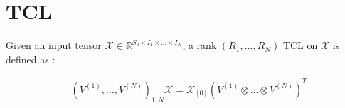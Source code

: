 \documentclass{article}
\begin{document}




%
%
%
%
%
%
%
%



\appendix


\section{TCL}
\label{A-tcl}
Given an input tensor $\mathcal{X} \in \mathbb{R}^{S_0\times I_1\times\dots\times I_N}$, a rank $(R_1,\dots,R_N)$ TCL on $\mathcal{X}$  is defined as :

\begin{align}
	\label{eq:tcl}
	&\left(V^{(1)},\dots,V^{(N)}\right)_{1:N} \mathcal{X} = \mathcal{X}_{[0]} (V^{(1)}\otimes\dots\otimes V^{(N)})^T
\end{align}
\end{document}
